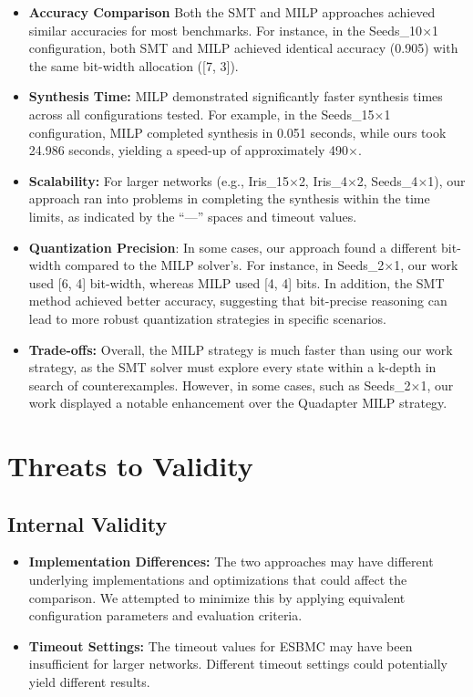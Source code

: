 \begin{itemize}
    \item \textbf{Accuracy Comparison} Both the SMT and MILP approaches achieved similar accuracies for most benchmarks. For instance, in the Seeds\_10$\times$1 configuration, both SMT and MILP achieved identical accuracy (0.905) with the same bit-width allocation ([7, 3]).
    
    \item \textbf{Synthesis Time:} MILP demonstrated significantly faster synthesis times across all configurations tested. For example, in the Seeds\_15$\times$1 configuration, MILP completed synthesis in 0.051 seconds, while ours took 24.986 seconds, yielding a speed-up of approximately 490$\times$.
    
    \item \textbf{Scalability:} For larger networks (e.g., Iris\_15$\times$2, Iris\_4$\times$2, Seeds\_4$\times$1), our approach ran into problems in completing the synthesis within the time limits, as indicated by the ``---'' spaces and timeout values.
    \item \textbf{Quantization Precision}: In some cases, our approach found a different bit-width compared to the MILP solver's. For instance, in Seeds\_2$\times$1, our work used [6, 4] bit-width, whereas MILP used [4, 4] bits. In addition, the SMT method achieved better accuracy, suggesting that bit-precise reasoning can lead to more robust quantization strategies in specific scenarios.
    
      \item \textbf{Trade-offs:} Overall, the MILP strategy is much faster than using our work strategy, as the SMT solver must explore every state within a k-depth in search of counterexamples. However, in some cases, such as Seeds\_2$\times$1, our work displayed a notable enhancement over the Quadapter MILP strategy.
\end{itemize}

\section{Threats to Validity}

\subsection{Internal Validity}

\begin{itemize}
    \item \textbf{Implementation Differences:} The two approaches may have different underlying implementations and optimizations that could affect the comparison. We attempted to minimize this by applying equivalent configuration parameters and evaluation criteria.
    
    \item \textbf{Timeout Settings:} The timeout values for ESBMC may have been insufficient for larger networks. Different timeout settings could potentially yield different results.
    

\end{itemize}

